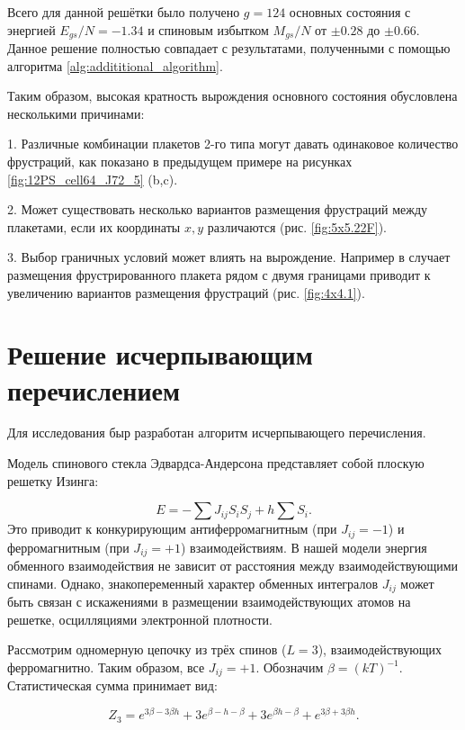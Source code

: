 \documentclass[utf8, babel, sor, jor, amsmath, amssymb, reprint]{elsarticle} %
\begin{document}
Всего для данной решётки было получено $g=124$ основных состояния с энергией $E_{gs}/N=-1.34$ и спиновым избытком $M_{gs}/N$ от $\pm 0.28$ до $\pm 0.66$. Данное решение полностью совпадает с результатами, полученными с помощью алгоритма \ref{alg:addititional_algorithm}.

Таким образом, высокая кратность вырождения основного состояния обусловлена несколькими причинами:

1. Различные комбинации плакетов 2-го типа могут давать одинаковое количество фрустраций, как показано в предыдущем примере на рисунках \ref{fig:12PS_cell64_J72_5} (b,c).

2. Может существовать несколько вариантов размещения фрустраций между плакетами, если их координаты $x,y$ различаются (рис. \ref{fig:5x5.22F}).

3. Выбор граничных условий может влиять на вырождение. Например в случает размещения фрустрированного плакета рядом с двумя границами приводит к увеличению вариантов размещения фрустраций (рис. \ref{fig:4x4.1}).



\section{Решение исчерпывающим перечислением}

Для исследования быр разработан алгоритм исчерпывающего перечисления.

Модель спинового стекла Эдвардса-Андерсона представляет собой плоскую решетку Изинга:

\begin{equation}
	E = -\sum J_{ij} S_i S_j + h \sum S_i.
	\label{eq:ising_energy}
\end{equation}
Это приводит к конкурирующим антиферромагнитным (при $J_{ij}=-1$) и ферромагнитным (при $J_{ij}=+1$) взаимодействиям. В нашей модели энергия обменного взаимодействия не зависит от расстояния между взаимодействующими спинами. Однако, знакопеременный характер обменных интегралов $J_{ij}$ может быть связан с искажениями в размещении взаимодействующих атомов на решетке, осцилляциями электронной плотности.

Рассмотрим одномерную цепочку из трёх спинов ($L=3$), взаимодействующих ферромагнитно. Таким образом, все $J_{ij}=+1$.  Обозначим $\beta = (kT)^{-1}$.  Статистическая сумма принимает вид:

\begin{equation}
	Z_3 = e^{3\beta - 3\beta h} + 3e^{\beta - h - \beta} + 3e^{\beta h - \beta} + e^{3\beta + 3\beta h}.
	\label{eq:stat_3}
\end{equation}
\end{document}
